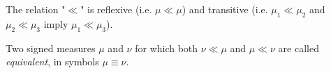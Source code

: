 The relation "$\ll$" is reflexive (i.e. $\mu \ll \mu$) and transitive (i.e. $\mu_1 \ll \mu_2$ and $\mu_2 \ll \mu_3$ imply $\mu_1 \ll \mu_3$).

Two signed measures $\mu$ and $\nu$ for which both $\nu \ll \mu$ and $\mu \ll \nu$ are called \textit{equivalent}, in symbols $\mu \equiv \nu$.

